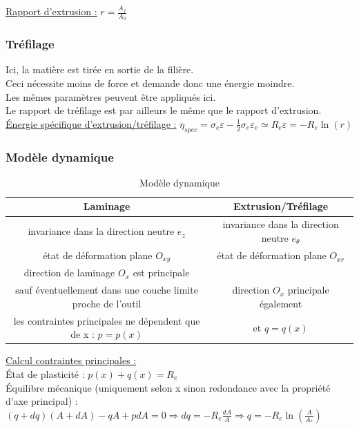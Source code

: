 \documentclass[../main.tex]{subfiles}
\begin{document}
\quad \underline{Rapport d'extrusion :} $r = \frac{A_f}{A_0}$\\

\subsubsection{Tréfilage}
Ici, la matière est tirée en sortie de la filière.\\
Ceci nécessite moins de force et demande donc une énergie moindre.\\
Les mêmes paramètres peuvent être appliqués ici.\\
Le rapport de tréfilage est par ailleurs le même que le rapport d'extrusion.\\

\quad \underline{Énergie spécifique d'extrusion/tréfilage :} $\eta_{spec} = \sigma_e\varepsilon - \frac{1}{2} \sigma_e \varepsilon_e \simeq R_e \varepsilon = -R_e \ln(r)$\\

\subsubsection{Modèle dynamique}
\begin{table}[hbt!]
    \centering
    \begin{tabular}{c|c}
        \hline \hline
        Laminage & Extrusion/Tréfilage \\
        \hline 
        invariance dans la direction neutre $e_z$ & invariance dans la direction neutre $e_\theta$\\
        état de déformation plane $O_{xy}$ & état de déformation plane $O_{xr}$\\
        direction de laminage $O_x$ est principale\\
        sauf éventuellement dans une couche limite proche de l'outil & direction $O_x$ principale également\\
        les contraintes principales ne dépendent que de x : $p = p(x)$ & et $q = q(x)$\\
    \end{tabular}
    \caption{Modèle dynamique}
\end{table}

\quad \underline{Calcul contraintes principales :}\\
État de plasticité : $p(x)+q(x)=R_e$\\
Équilibre mécanique (uniquement selon x sinon redondance avec la propriété d'axe principal) : $(q+dq)(A+dA) - qA + pdA = 0 \Rightarrow dq = -R_e \frac{dA}{A} \Rightarrow q = -R_e \ln(\frac{A}{A_*})$\\
\end{document}
